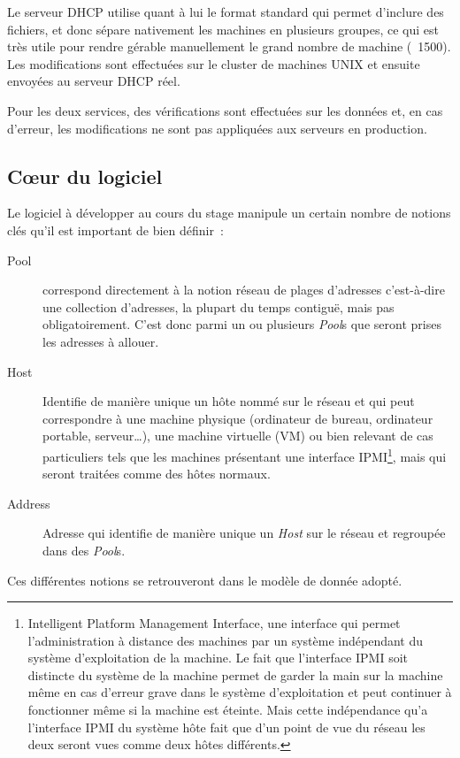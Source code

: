 \documentclass[12pt,a4paper,twoside]{report}
\begin{document}
Le serveur DHCP utilise quant à lui le format standard qui permet d’inclure des
fichiers, et donc sépare nativement les machines en plusieurs groupes, ce qui
est très utile pour rendre gérable manuellement le grand nombre de machine
(~1500). Les modifications sont effectuées sur le cluster de machines
UNIX et ensuite envoyées au serveur DHCP réel.

Pour les deux services, des vérifications sont effectuées sur les données et,
en cas d’erreur, les modifications ne sont pas appliquées aux serveurs en
production.

\subsection{Cœur du logiciel}
\label{sec:core}

Le logiciel à développer au cours du stage manipule un certain nombre de
notions clés qu’il est important de bien définir~:

\begin{description}
	\item[Pool] correspond directement à la notion réseau de plages d’adresses
	c'est-à-dire une collection d’adresses, la plupart du temps contiguë,
	mais pas obligatoirement. C’est donc parmi un ou plusieurs \emph{Pool}s que
	seront prises les adresses à allouer.
	\item[Host] Identifie de manière unique un hôte nommé sur le réseau et qui
	peut correspondre à une machine physique (ordinateur de bureau, ordinateur
	portable, serveur…), une machine virtuelle (VM) ou bien relevant de cas
	particuliers tels que les machines présentant une interface
	IPMI\footnote{Intelligent Platform Management Interface, une interface qui
	permet l’administration à distance des machines par un système indépendant
	du système d’exploitation de la machine. Le fait que l’interface IPMI soit
	distincte du système de la machine permet de garder la main sur la machine
	même en cas d’erreur grave dans le système d’exploitation et peut continuer
	à fonctionner même si la machine est éteinte. Mais cette indépendance qu’a
	l’interface IPMI du système hôte fait que d’un point de vue du réseau les
	deux seront vues comme deux hôtes différents.}, mais qui
	seront traitées comme des hôtes normaux.
	\item[Address] Adresse qui identifie de manière unique un \emph{Host} sur
	le réseau et regroupée dans des \emph{Pool}s.
\end{description}

Ces différentes notions se retrouveront dans le modèle de donnée adopté.\\
\end{document}
